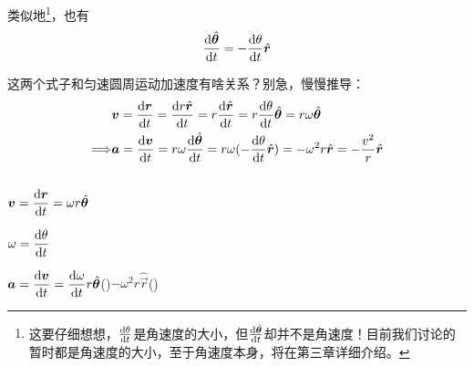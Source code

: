 类似地\footnote{这要仔细想想，$\frac{\dif \theta}{\dif t}$是角速度的大小，但$\frac{\dif \hat{\vec{\theta}}}{\dif t}$却并不是角速度！目前我们讨论的暂时都是角速度的大小，至于角速度本身，将在第三章详细介绍。}，也有
\[\displaystyle\frac{\dif \hat{\vec{\theta}}}{\dif t}=-\frac{\dif \theta}{\dif t}\hat{\vec{r}}\]

这两个式子和匀速圆周运动加速度有啥关系？别急，慢慢推导：
\begin{equation}
    \begin{aligned}
                        & \vec{v}=\frac{\dif \vec{r}}{\dif t}=\frac{\dif {r\hat{\vec{r}}}}{\dif t}=r\frac{\dif \hat{\vec{r}}}{\dif t}=r\frac{\dif \theta}{\dif t}\hat{\vec{\theta}}=r\omega \hat{\vec{\theta}}         \\
        \Longrightarrow & \vec{a}=\frac{\dif \vec{v}}{\dif t}=r\omega\frac{\dif \hat{\vec{\theta}}}{\dif t}=r\omega(-\frac{\dif \theta}{\dif t}\hat{\vec{r}} )=-\omega^{2}r\hat{\vec{r}}=-\frac{v^{2}}{r}\hat{\vec{r}}
    \end{aligned}
    \nonumber
\end{equation}

\subsection[变速圆周运动]{}
\begin{center}
\end{center}

\begin{Itemize}
    \item $\displaystyle\vec{v}=\frac{\dif \vec{r}}{\dif t}=\omega r\hat{\vec{\theta}}$
    \item $\displaystyle\omega=\frac{\dif \theta}{\dif t}$
    \item $\displaystyle\vec{a}=\frac{\dif \vec{v}}{\dif t}=\frac{\dif \omega}{\dif t}r\hat{\vec{\theta}}$()$-\displaystyle\omega^2 r\hat{\vec{r}}$()
\end{Itemize}
